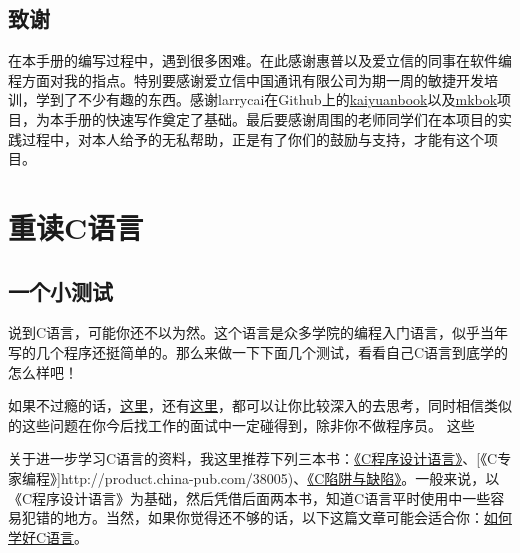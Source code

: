 \documentclass[a4paper]{book}
\makeatletter
\let\savedtitle=\@title
\renewcommand{\headrulewidth}{0pt}
\newcounter{tab}[chapter]
\newcommand{\chap}[1]{\newpage\thispagestyle{empty}\chapter{#1}\label{chap:\thechapter}}
\makeatother
\begin{document}
\section*{致谢}

在本手册的编写过程中，遇到很多困难。在此感谢惠普以及爱立信的同事在软件编程方面对我的指点。特别要感谢爱立信中国通讯有限公司为期一周的敏捷开发培训，学到了不少有趣的东西。感谢larrycai在Github上的\href{www.github.com/larrycai/kaiyuanbook}{kaiyuanbook}以及\href{www.github.com/larrycai/mkbok}{mkbok}项目，为本手册的快速写作奠定了基础。最后要感谢周围的老师同学们在本项目的实践过程中，对本人给予的无私帮助，正是有了你们的鼓励与支持，才能有这个项目。

\tableofcontents\newpage\thispagestyle{empty}


\fancyhf{}
\fancyhead[LE]{\color{colorheader}\quad\small\textbf\thepage\quad\quad\small\leftmark}
\fancyhead[RO]{\color{colorheader}\small\rightmark\quad\quad\small\textbf\thepage\quad}

\pagestyle{fancy}

\mainmatter
\chap{重读C语言}

\section{一个小测试}

说到C语言，可能你还不以为然。这个语言是众多学院的编程入门语言，似乎当年写的几个程序还挺简单的。那么来做一下下面几个测试，看看自己C语言到底学的怎么样吧！

如果不过瘾的话，\href{http://coolshell.cn/articles/945.html}{这里}，还有\href{http://coolshell.cn/articles/873.html}{这里}，都可以让你比较深入的去思考，同时相信类似的这些问题在你今后找工作的面试中一定碰得到，除非你不做程序员。 这些

关于进一步学习C语言的资料，我这里推荐下列三本书：\href{http://product.china-pub.com/14975\&ref=browse}{《C程序设计语言》}、{[}《C专家编程》{]}http://product.china-pub.com/38005)、\href{http://product.china-pub.com/38125}{《C陷阱与缺陷》}。一般来说，以《C程序设计语言》为基础，然后凭借后面两本书，知道C语言平时使用中一些容易犯错的地方。当然，如果你觉得还不够的话，以下这篇文章可能会适合你：\href{http://coolshell.cn/articles/4102.html}{如何学好C语言}。
\end{document}
